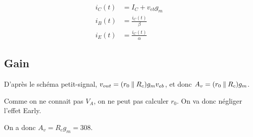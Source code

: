 \documentclass[frenchb,DIV=13]{scrartcl}
\begin{document}
\begin{align*}
    i_C(t) &= I_C + v_{eb} g_m \\
    i_B(t) &= \frac{i_C(t)}{\beta} \\
    i_E(t) &= \frac{i_C(t)}{\alpha}
\end{align*}

\subsection*{Gain}

D'après le schéma petit-signal, $v_{out} = (r_0 \mathbin{\|} R_c) g_m v_{eb}$,
et donc $A_v = (r_0 \mathbin{\|} R_c) g_m$.

Comme on ne connait pas $V_A$, on ne peut pas calculer $r_0$. On va donc négliger
l'effet Early.

On a donc $A_v = R_c g_m = 308$.
\end{document}
